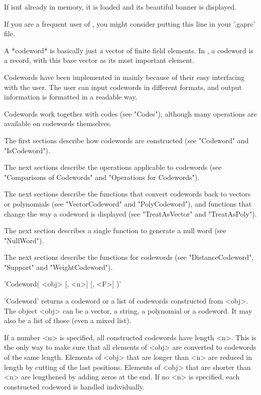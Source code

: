 If {\GUAVA} isn\'t  already  in memory,  it is  loaded and its  beautiful
banner is displayed.

If you  are a frequent user of  {\GUAVA}, you might consider putting this
line in your '.gaprc' file.


A  *codeword* is basically  just  a vector  of  finite field elements. In
{\GUAVA}, a codeword  is  a record,  with this  base vector  as  its most
important element.

Codewords have been implemented in {\GUAVA} mainly  because of their easy
interfacing  with the  user. The user  can  input  codewords in different
formats, and output information is formatted in a readable way.

Codewords   work together  with codes     (see "Codes"), although    many
operations are available on codewords themselves.

The first sections describe how codewords are constructed (see "Codeword"
and "IsCodeword").

The next sections describe  the  operations applicable to codewords  (see
"Comparisons of Codewords" and "Operations for Codewords").

The next sections  describe the functions  that convert codewords back to
vectors  or  polynomials (see  "VectorCodeword"  and "PolyCodeword"), and
functions   that  change  the   way   a   codeword   is  displayed   (see
"TreatAsVector" and "TreatAsPoly").

The next section describes a single function to generate a null word (see
"NullWord").

The  next    sections describe    the    functions for   codewords   (see
"DistanceCodeword", "Support" and "WeightCodeword").


'Codeword( <obj> [, <n>] [, <F>] )'

'Codeword' returns  a codeword  or a list  of codewords  constructed from
<obj>.  The object <obj>  can be a vector,  a  string, a polynomial or  a
codeword. It may also be a list of those (even a mixed list).

If a number  <n> is   specified, all  constructed codewords  have  length
<n>. This  is the only  way to make sure that  all  elements of <obj> are
converted  to  codewords of the same  length.  Elements of <obj> that are
longer   than <n>  are   reduced in   length  by  cutting  of the    last
positions. Elements of <obj> that are  shorter than <n> are lengthened by
adding zeros  at  the  end.  If no  <n>  is specified,  each  constructed
codeword is handled individually.

